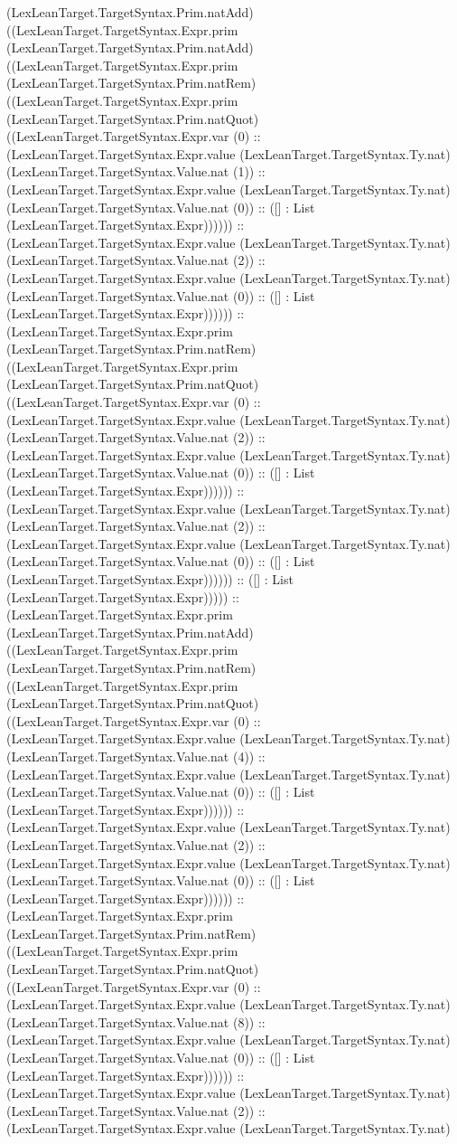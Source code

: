 \documentclass[11pt]{article}
\begin{document}
(LexLeanTarget.TargetSyntax.Prim.natAdd) ((LexLeanTarget.TargetSyntax.Expr.prim (LexLeanTarget.TargetSyntax.Prim.natAdd) ((LexLeanTarget.TargetSyntax.Expr.prim (LexLeanTarget.TargetSyntax.Prim.natRem) ((LexLeanTarget.TargetSyntax.Expr.prim (LexLeanTarget.TargetSyntax.Prim.natQuot) ((LexLeanTarget.TargetSyntax.Expr.var (0) :: (LexLeanTarget.TargetSyntax.Expr.value (LexLeanTarget.TargetSyntax.Ty.nat) (LexLeanTarget.TargetSyntax.Value.nat (1)) :: (LexLeanTarget.TargetSyntax.Expr.value (LexLeanTarget.TargetSyntax.Ty.nat) (LexLeanTarget.TargetSyntax.Value.nat (0)) :: ([] : List (LexLeanTarget.TargetSyntax.Expr)))))) :: (LexLeanTarget.TargetSyntax.Expr.value (LexLeanTarget.TargetSyntax.Ty.nat) (LexLeanTarget.TargetSyntax.Value.nat (2)) :: (LexLeanTarget.TargetSyntax.Expr.value (LexLeanTarget.TargetSyntax.Ty.nat) (LexLeanTarget.TargetSyntax.Value.nat (0)) :: ([] : List (LexLeanTarget.TargetSyntax.Expr)))))) :: (LexLeanTarget.TargetSyntax.Expr.prim (LexLeanTarget.TargetSyntax.Prim.natRem) ((LexLeanTarget.TargetSyntax.Expr.prim (LexLeanTarget.TargetSyntax.Prim.natQuot) ((LexLeanTarget.TargetSyntax.Expr.var (0) :: (LexLeanTarget.TargetSyntax.Expr.value (LexLeanTarget.TargetSyntax.Ty.nat) (LexLeanTarget.TargetSyntax.Value.nat (2)) :: (LexLeanTarget.TargetSyntax.Expr.value (LexLeanTarget.TargetSyntax.Ty.nat) (LexLeanTarget.TargetSyntax.Value.nat (0)) :: ([] : List (LexLeanTarget.TargetSyntax.Expr)))))) :: (LexLeanTarget.TargetSyntax.Expr.value (LexLeanTarget.TargetSyntax.Ty.nat) (LexLeanTarget.TargetSyntax.Value.nat (2)) :: (LexLeanTarget.TargetSyntax.Expr.value (LexLeanTarget.TargetSyntax.Ty.nat) (LexLeanTarget.TargetSyntax.Value.nat (0)) :: ([] : List (LexLeanTarget.TargetSyntax.Expr)))))) :: ([] : List (LexLeanTarget.TargetSyntax.Expr))))) :: (LexLeanTarget.TargetSyntax.Expr.prim (LexLeanTarget.TargetSyntax.Prim.natAdd) ((LexLeanTarget.TargetSyntax.Expr.prim (LexLeanTarget.TargetSyntax.Prim.natRem) ((LexLeanTarget.TargetSyntax.Expr.prim (LexLeanTarget.TargetSyntax.Prim.natQuot) ((LexLeanTarget.TargetSyntax.Expr.var (0) :: (LexLeanTarget.TargetSyntax.Expr.value (LexLeanTarget.TargetSyntax.Ty.nat) (LexLeanTarget.TargetSyntax.Value.nat (4)) :: (LexLeanTarget.TargetSyntax.Expr.value (LexLeanTarget.TargetSyntax.Ty.nat) (LexLeanTarget.TargetSyntax.Value.nat (0)) :: ([] : List (LexLeanTarget.TargetSyntax.Expr)))))) :: (LexLeanTarget.TargetSyntax.Expr.value (LexLeanTarget.TargetSyntax.Ty.nat) (LexLeanTarget.TargetSyntax.Value.nat (2)) :: (LexLeanTarget.TargetSyntax.Expr.value (LexLeanTarget.TargetSyntax.Ty.nat) (LexLeanTarget.TargetSyntax.Value.nat (0)) :: ([] : List (LexLeanTarget.TargetSyntax.Expr)))))) :: (LexLeanTarget.TargetSyntax.Expr.prim (LexLeanTarget.TargetSyntax.Prim.natRem) ((LexLeanTarget.TargetSyntax.Expr.prim (LexLeanTarget.TargetSyntax.Prim.natQuot) ((LexLeanTarget.TargetSyntax.Expr.var (0) :: (LexLeanTarget.TargetSyntax.Expr.value (LexLeanTarget.TargetSyntax.Ty.nat) (LexLeanTarget.TargetSyntax.Value.nat (8)) :: (LexLeanTarget.TargetSyntax.Expr.value (LexLeanTarget.TargetSyntax.Ty.nat) (LexLeanTarget.TargetSyntax.Value.nat (0)) :: ([] : List (LexLeanTarget.TargetSyntax.Expr)))))) :: (LexLeanTarget.TargetSyntax.Expr.value (LexLeanTarget.TargetSyntax.Ty.nat) (LexLeanTarget.TargetSyntax.Value.nat (2)) :: (LexLeanTarget.TargetSyntax.Expr.value (LexLeanTarget.TargetSyntax.Ty.nat) 
\end{document}
